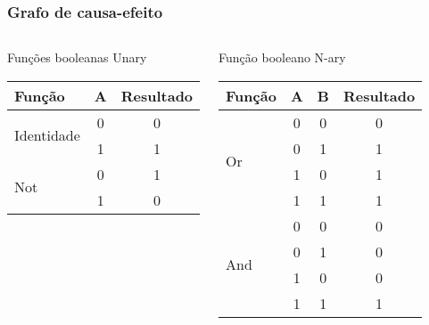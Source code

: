 \begin{frame}
\frametitle{Grafo de causa-efeito}


\begin{columns}[t]
\begin{block:fact}{Funções booleanas Unary}
\begin{tabular}{l|c|c}
\textbf{Função}			& \textbf{A}	& \textbf{Resultado}\\\hline\hline
\multirow{2}{*}{Identidade} 	& 0 			& 0\\
							& 1 			& 1\\\hline\hline
\multirow{2}{*}{Not}		& 0 			& 1\\
							& 1				& 0\\
\end{tabular}
\end{block:fact}

\qquad
{}
\begin{block:fact}{Função booleano N-ary}
\begin{tabular}{l|c|c|c}
\textbf{Função}			& \textbf{A}	& \textbf{B}	& \textbf{Resultado}\\\hline\hline
\multirow{4}{*}{Or} 		& 0 			& 0				& 0\\
							& 0 			& 1				& 1\\
							& 1 			& 0				& 1\\
							& 1 			& 1				& 1\\\hline\hline
\multirow{4}{*}{And}		& 0 			& 0				& 0\\
							& 0 			& 1				& 0\\
							& 1 			& 0				& 0\\
							& 1 			& 1				& 1\\
\end{tabular}
\end{block:fact}
\end{columns}

\end{frame}



% 
% 
% 





